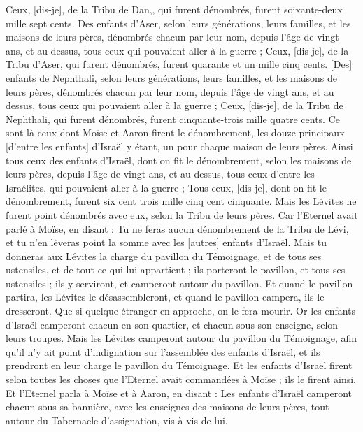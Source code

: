 \begin{multicols}{2}
Ceux, [dis-je], de la Tribu de Dan,, qui furent dénombrés, furent soixante-deux mille sept cents.
Des enfants d'Aser, selon leurs générations, leurs familles, et les maisons de leurs pères, dénombrés chacun par leur nom, depuis l'âge de vingt ans, et au dessus, tous ceux qui pouvaient aller à la guerre ;
Ceux, [dis-je], de la Tribu d'Aser, qui furent dénombrés, furent quarante et un mille cinq cents.
[Des] enfants de Nephthali, selon leurs générations, leurs familles, et les maisons de leurs pères, dénombrés chacun par leur nom, depuis l'âge de vingt ans, et au dessus, tous ceux qui pouvaient aller à la guerre ;
Ceux, [dis-je], de la Tribu de Nephthali, qui furent dénombrés, furent cinquante-trois mille quatre cents.
Ce sont là ceux dont Moïse et Aaron firent le dénombrement, les douze principaux [d'entre les enfants] d'Israël y étant, un pour chaque maison de leurs pères.
Ainsi tous ceux des enfants d'Israël, dont on fit le dénombrement, selon les maisons de leurs pères, depuis l'âge de vingt ans, et au dessus, tous ceux d'entre les Israélites, qui pouvaient aller à la guerre ;
Tous ceux, [dis-je], dont on fit le dénombrement, furent six cent trois mille cinq cent cinquante.
Mais les Lévites ne furent point dénombrés avec eux, selon la Tribu de leurs pères.
Car l'Eternel avait parlé à Moïse, en disant :
Tu ne feras aucun dénombrement de la Tribu de Lévi, et tu n'en lèveras point la somme avec les [autres] enfants d'Israël.
Mais tu donneras aux Lévites la charge du pavillon du Témoignage, et de tous ses ustensiles, et de tout ce qui lui appartient ; ils porteront le pavillon, et tous ses ustensiles ; ils y serviront, et camperont autour du pavillon.
Et quand le pavillon partira, les Lévites le désassembleront, et quand le pavillon campera, ils le dresseront. Que si quelque étranger en approche, on le fera mourir.
Or les enfants d'Israël camperont chacun en son quartier, et chacun sous son enseigne, selon leurs troupes.
Mais les Lévites camperont autour du pavillon du Témoignage, afin qu'il n'y ait point d'indignation sur l'assemblée des enfants d'Israël, et ils prendront en leur charge le pavillon du Témoignage.
Et les enfants d'Israël firent selon toutes les choses que l'Eternel avait commandées à Moïse ; ils le firent ainsi.
\VerseOne{}Et l'Eternel parla à Moïse et à Aaron, en disant :
Les enfants d'Israël camperont chacun sous sa bannière, avec les enseignes des maisons de leurs pères, tout autour du Tabernacle d'assignation, vis-à-vis de lui.

\end{multicols}
